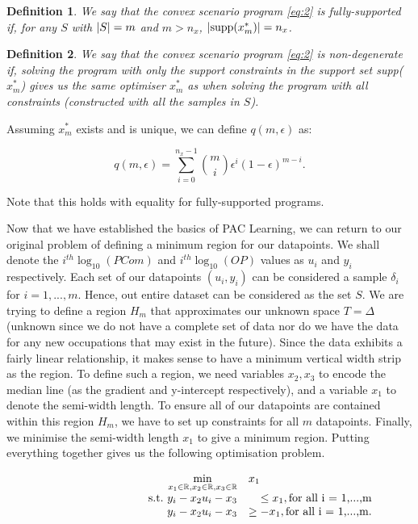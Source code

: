 \documentclass[11pt]{article}
\newtheorem{theorem}{Definition}
\begin{document}
\begin{theorem}
	We say that the convex scenario program \ref{eq:2} is fully-supported if, for any $S$ with $\abs{S} = m$ and $m > n_{x}$, $\abs{\text{supp}(x^{*}_{m})} = n_{x}$.
\end{theorem}

\begin{theorem}
	We say that the convex scenario program \ref{eq:2} is non-degenerate if, solving the program with only the support constraints in the support set supp($x^{*}_{m}$) gives us the same optimiser $x^{*}_{m}$ as when solving the program with all constraints (constructed with all the samples in $S$).
\end{theorem}

Assuming $x^{*}_{m}$ exists and is unique, we can define $q(m,\epsilon)$ as:

\begin{equation}
	\label{eq:4}
	q(m,\epsilon) = \sum_{i=0}^{n_{x}-1}{m \choose i}\epsilon^{i}(1-\epsilon)^{m-i}.
\end{equation}

Note that this holds with equality for fully-supported programs.

Now that we have established the basics of PAC Learning, we can return to our original problem of defining a minimum region for our datapoints. We shall denote the $i^{th} \log_{10}(PCom)$ and $i^{th} \log_{10}(OP)$ values as $u_{i}$ and $y_{i}$ respectively. Each set of our datapoints $(u_{i}, y_{i})$ can be considered a sample $\delta_{i}$ for $i=1,...,m$. Hence, out entire dataset can be considered as the set $S$.  We are trying to define a region $H_{m}$ that approximates our unknown space $T=\Delta$ (unknown since we do not have a complete set of data nor do we have the data for any new occupations that may exist in the future). Since the data exhibits a fairly linear relationship, it makes sense to have a minimum vertical width strip as the region. To define such a region, we need variables $x_{2}, x_{3}$ to encode the median line (as the gradient and y-intercept respectively), and a variable $x_{1}$ to denote the semi-width length. To ensure all of our datapoints are contained within this region $H_{m}$, we have to set up constraints for all $m$ datapoints. Finally, we minimise the semi-width length $x_{1}$ to give a minimum region. Putting everything together gives us the following optimisation problem.

\begin{align}
	\label{eq:5}
	\begin{array}{rrclcl}
	\displaystyle \min_{x_{1} \in \mathbb{R},x_{2} \in \mathbb{R},x_{3} \in \mathbb{R}}&  \multicolumn{3}{l}{x_{1}}&\\
	\textrm{s.t.}\  y_{i} - x_{2}u_{i} - x_{3} &\leq x_{1}, \text{for all i = 1,...,m}&\\
	y_{i} - x_{2}u_{i} - x_{3} &\geq -x_{1}, \text{for all i = 1,...,m}.&\\
	\end{array}
\end{align}
\end{document}
